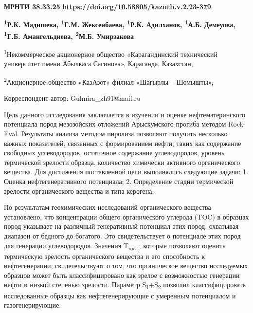 \newpage
{}
{\bfseries МРНТИ 38.33.25}
\hfill {\bfseries \href{https://doi.org/10.58805/kazutb.v.2.23-379}{https://doi.org/10.58805/kazutb.v.2.23-379}}


\begin{center}
{\bfseries \textsuperscript{1}Р.К. Мадишева, \textsuperscript{1}Г.М. Жексенбаева\envelope, \textsuperscript{1}Р.К. Адилханов, \textsuperscript{1}А.Б. Демеуова, \textsuperscript{1}Г.Б. Амангельдиева, \textsuperscript{2}М.Б. Умирзакова}

\textsuperscript{1}Некоммерческое акционерное общество «Карагандинский
технический университет имени Абылкаса Сагинова», Караганда, Казахстан,

\textsuperscript{2}Акционерное общество «КазАзот» филиал «Шагырлы --
Шомышты»,

\envelope Корреспондент-автор: Gulmira\_zh91@mail.ru
\end{center}

Цель данного исследования заключается в изучении и оценке
нефтематеринского потенциала пород мезозойских отложений Арыскумского
прогиба методом Rock-Eval. Результаты анализа методом пиролиза позволяют
получить несколько важных показателей, связанных с формированием нефти,
таких как содержание свободных углеводородов, остаточное содержание
углеводородов, уровень термической зрелости образца, количество
химически активного органического вещества. Для достижения поставленной
цели выполнялись следующие задачи: 1. Оценка нефтегенеративного
потенциала; 2. Определение стадии термической зрелости органического
вещества и типа керогена.

По результатам геохимических исследований органического вещества
установлено, что концентрации общего органического углерода (TOC) в
образцах пород указывает на различный генеративный потенциал этих пород,
охватывая диапазон от бедного до богатого. Это свидетельствует о
потенциале этих пород для генерации углеводородов. Значения
T\textsubscript{max}, которые позволяют оценить термическую зрелость
органического вещества и его способность к нефтегенерации,
свидетельствуют о том, что органическое вещество исследуемых образцов
может быть классифицировано как зрелое с возможностью генерации нефти и
низкой степенью зрелости. Параметр S\textsubscript{1}+S\textsubscript{2}
позволил классифицировать исследованные образцы как нефтегенерирующие с
умеренным потенциалом и газогенерирующие.

